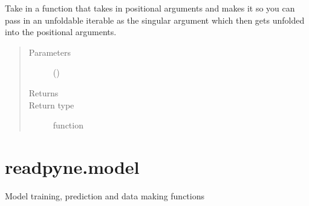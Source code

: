 \documentclass[letterpaper,10pt,english]{sphinxmanual}
\begin{document}

\begin{fulllineitems}
\label{\detokenize{api:readpyne.decorators.unfold_args}}
Take in a function that takes in positional arguments
and makes it so you can pass in an unfoldable iterable as
the singular argument which then gets unfolded into the
positional arguments.
\begin{quote}\begin{description}
\item[{Parameters}] \leavevmode
{} () \textendash{} 

\item[{Returns}] \leavevmode


\item[{Return type}] \leavevmode
function

\end{description}\end{quote}

\end{fulllineitems}

\label{\detokenize{api:module-readpyne.model}}

\section{readpyne.model}
\label{\detokenize{api:readpyne-model}}
Model training, prediction and data making functions
\end{document}
